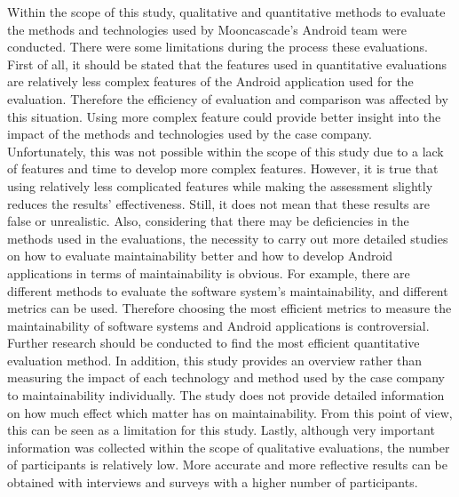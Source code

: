 Within the scope of this study, qualitative and quantitative methods to evaluate the methods and technologies used by Mooncascade's Android team were conducted. There were some limitations during the process these evaluations. 
First of all, it should be stated that the features used in quantitative evaluations are relatively less complex features of the Android application used for the evaluation. Therefore the efficiency of evaluation and comparison was affected by this situation. Using more complex feature could provide better insight into the impact of the methods and technologies used by the case company. Unfortunately, this was not possible within the scope of this study due to a lack of features and time to develop more complex features. However, it is true that using relatively less complicated features while making the assessment slightly reduces the results' effectiveness. Still, it does not mean that these results are false or unrealistic. Also, considering that there may be deficiencies in the methods used in the evaluations, the necessity to carry out more detailed studies on how to evaluate maintainability better and how to develop Android applications in terms of maintainability is obvious. For example, there are different methods to evaluate the software system's maintainability, and different metrics can be used. Therefore choosing the most efficient metrics to measure the maintainability of software systems and Android applications is controversial. Further research should be conducted to find the most efficient quantitative evaluation method. In addition, this study provides an overview rather than measuring the impact of each technology and method used by the case company to maintainability individually. The study does not provide detailed information on how much effect which matter has on maintainability. From this point of view, this can be seen as a limitation for this study. Lastly, although very important information was collected within the scope of qualitative evaluations, the number of participants is relatively low. More accurate and more reflective results can be obtained with interviews and surveys with a higher number of participants.
